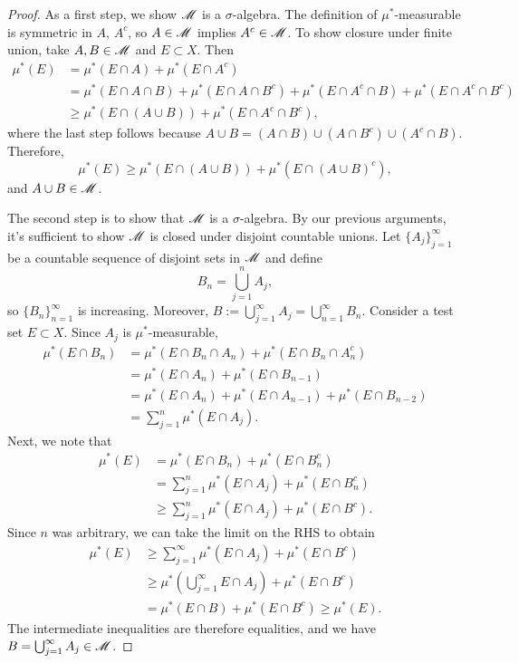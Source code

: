 \documentclass[12pt]{article} %
\begin{document}
\begin{proof}
    As a first step, we show $\mathscr{M}$ is a $\sigma$-algebra. The definition of $\mu^*$-measurable is symmetric in $A$, $A^c$, so $A \in \mathscr{M}$ implies $A^c \in \mathscr{M}$. To show closure under finite union, take $A, B \in \mathscr{M}$ and $E \subset X$. Then \begin{align*}
        \mu^*(E) &= \mu^*(E \cap A) + \mu^*(E \cap A^c)\\
        &= \mu^*(E \cap A \cap B) + \mu^*(E \cap A \cap B^c) + \mu^*(E \cap A^c \cap B) + \mu^*(E \cap A^c \cap B^c)\\
        &\geq \mu^*(E \cap (A \cup B)) + \mu^*(E \cap A^c \cap B^c),
    \end{align*} where the last step follows because $A \cup B = (A \cap B) \cup (A \cap B^c) \cup (A^c \cap B)$. Therefore, \[\mu^*(E) \geq \mu^*(E \cap (A \cup B)) + \mu^*(E \cap (A \cup B)^c),\] and $A \cup B \in \mathscr{M}$.

    The second step is to show that $\mathscr{M}$ is a $\sigma$-algebra. By our previous arguments, it's sufficient to show $\mathscr{M}$ is closed under disjoint countable unions. Let $\{A_j\}_{j=1}^{\infty}$ be a countable sequence of disjoint sets in $\mathscr{M}$ and define \[B_n = \bigcup_{j=1}^{n} A_j,\] so $\{B_n\}_{n=1}^{\infty}$ is increasing. Moreover, $B := \bigcup_{j=1}^{\infty} A_j = \bigcup_{n=1}^{\infty} B_n$. Consider a test set $E \subset X$. Since $A_j$ is $\mu^*$-measurable, \begin{align*}
        \mu^*(E \cap B_n) &= \mu^*(E \cap B_n \cap A_n) + \mu^*(E \cap B_n \cap A_n^c)\\
        &= \mu^*(E \cap A_n) + \mu^*(E \cap B_{n-1})\\
        &= \mu^*(E \cap A_n) + \mu^*(E \cap A_{n-1}) + \mu^*(E \cap B_{n-2})\\
        &= \sum_{j=1}^{n} \mu^*(E \cap A_j).
    \end{align*} Next, we note that \begin{align*}
        \mu^*(E) &= \mu^*(E \cap B_n) + \mu^*(E \cap B_n^c)\\
        &= \sum_{j=1}^{n} \mu^*(E \cap A_j) + \mu^*(E \cap B_n^c)\\
        &\geq \sum_{j=1}^{n} \mu^*(E \cap A_j) + \mu^*(E \cap B^c).
    \end{align*} Since $n$ was arbitrary, we can take the limit on the RHS to obtain \begin{align*}
        \mu^*(E) &\geq \sum_{j=1}^{\infty} \mu^*(E \cap A_j) + \mu^*(E \cap B^c)\\
        &\geq \mu^*\left(\bigcup_{j=1}^{\infty} E \cap A_j \right) + \mu^*(E \cap B^c)\\
        &= \mu^*(E \cap B) + \mu^*(E \cap B^c) \geq \mu^*(E).
    \end{align*}
    The intermediate inequalities are therefore equalities, and we have $B = \bigcup_{j=1}^{\infty} A_j \in \mathscr{M}$.


\end{proof}
\end{document}
